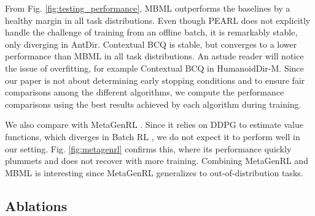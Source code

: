 From Fig. \ref{fig:testing_performance}, MBML outperforms the baselines by a healthy margin in all task distributions. Even though PEARL does not explicitly handle the challenge of training from an offline batch, it is remarkably stable, only diverging in AntDir. Contextual BCQ is stable, but converges to a lower performance than MBML in all task distributions. An astude reader will notice the issue of overfitting, for example Contextual BCQ in HumanoidDir-M. Since our paper is not about determining early stopping conditions and to ensure fair comparisons among the different algorithms, we compute the performance comparisons using the best results achieved by each algorithm during training.

We also compare with MetaGenRL \cite{metagenrl}. Since it relies on DDPG \cite{ddpg} to estimate value functions, which diverges in Batch RL \cite{fujimoto2019off}, we do not expect it to perform well in our setting. Fig. \ref{fig:metagenrl} confirms this, where its performance quickly plummets and does not recover with more training.
Combining MetaGenRL and MBML is interesting since MetaGenRL generalizes to out-of-distribution tasks.


\subsection{Ablations}\label{sec_exp_ablation}

